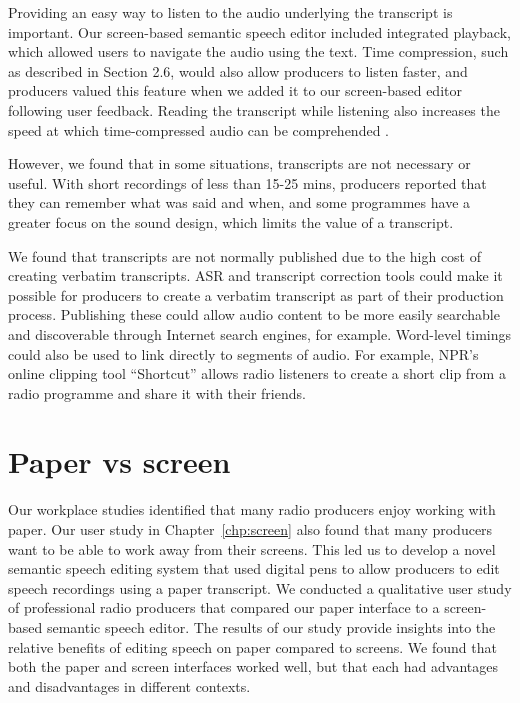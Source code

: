 
Providing an easy way to listen to the audio underlying the transcript is important. Our screen-based semantic speech
editor included integrated playback, which allowed users to navigate the audio using the text.  Time compression, such
as described in Section 2.6, would also allow producers to listen faster, and producers valued this feature when we
added it to our screen-based editor following user feedback. Reading the transcript while listening also increases the
speed at which time-compressed audio can be comprehended \citep{Vemuri2004}.

However, we found that in some situations, transcripts are not necessary or useful. With short recordings of less than
15-25 mins, producers reported that they can remember what was said and when, and some programmes have a greater focus
on the sound design, which limits the value of a transcript.



We found that transcripts are not normally published due to the high cost of creating verbatim transcripts.  ASR and
transcript correction tools could make it possible for producers to create a verbatim transcript as part of their
production process.  Publishing these could allow audio content to be more easily searchable and discoverable through
Internet search engines, for example.  Word-level timings could also be used to link directly to segments of audio. For
example, NPR's online clipping tool ``Shortcut'' \citep{Friedhoff2016} allows radio listeners to create a short clip
from a radio programme and share it with their friends. 

\section{Paper vs screen}

Our workplace studies identified that many radio producers enjoy working with paper.  Our user study in
Chapter~\ref{chp:screen} also found that many producers want to be able to work away from their screens.  This led us
to develop a novel semantic speech editing system that used digital pens to allow producers to edit speech recordings
using a paper transcript.  We conducted a qualitative user study of professional radio producers that compared our
paper interface to a screen-based semantic speech editor. The results of our study provide insights into the relative
benefits of editing speech on paper compared to screens. We found that both the paper and screen interfaces worked
well, but that each had advantages and disadvantages in different contexts.


